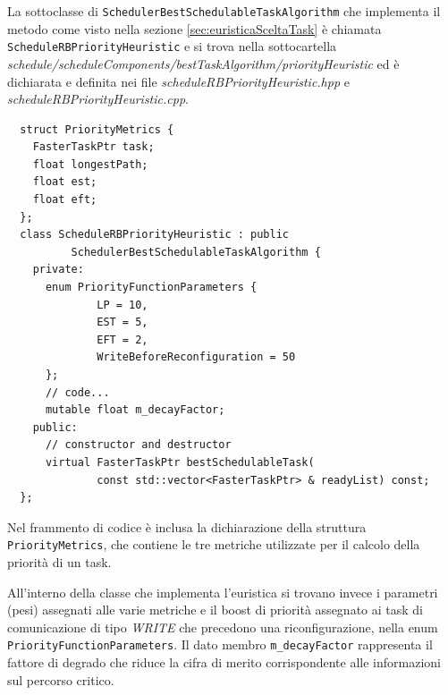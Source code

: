 La sottoclasse di \verb+SchedulerBestSchedulableTaskAlgorithm+
che implementa il metodo come visto nella sezione \ref{sec:euristicaSceltaTask}
è chiamata \verb+ScheduleRBPriorityHeuristic+ e si trova nella sottocartella 
\emph{schedule/scheduleComponents/bestTaskAlgorithm/priorityHeuristic} ed è 
dichiarata e definita nei file \emph{scheduleRBPriorityHeuristic.hpp} e 
\emph{scheduleRBPriorityHeuristic.cpp}.
\newline
\begin{verbatim}
  struct PriorityMetrics {
    FasterTaskPtr task;
    float longestPath;
    float est;
    float eft;
  };
  class ScheduleRBPriorityHeuristic : public 
          SchedulerBestSchedulableTaskAlgorithm {
    private:
      enum PriorityFunctionParameters {
              LP = 10,
              EST = 5,
              EFT = 2,
              WriteBeforeReconfiguration = 50
      };
      // code...
      mutable float m_decayFactor;
    public:
      // constructor and destructor
      virtual FasterTaskPtr bestSchedulableTask(
              const std::vector<FasterTaskPtr> & readyList) const;
  };
\end{verbatim}

Nel frammento di codice è inclusa la dichiarazione della 
struttura \verb+PriorityMetrics+, che contiene le tre metriche utilizzate per 
il calcolo della priorità di un task.

All'interno della classe che implementa l'euristica si trovano invece i 
parametri (pesi) assegnati alle varie metriche e il boost di priorità assegnato 
ai task di comunicazione di tipo \emph{WRITE} che precedono una 
riconfigurazione, nella enum \verb+PriorityFunctionParameters+. Il dato membro 
\verb+m_decayFactor+ rappresenta il fattore di degrado che riduce la cifra di 
merito corrispondente alle informazioni sul percorso critico.

